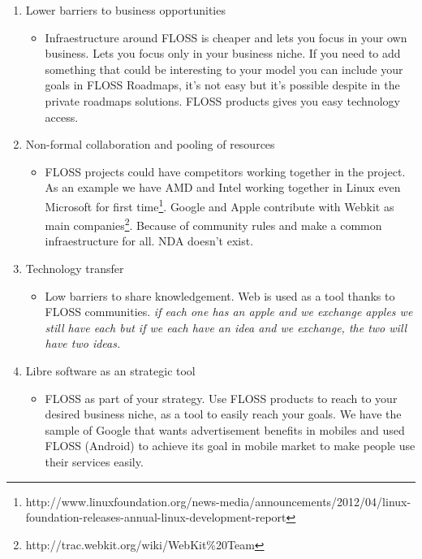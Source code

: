 \documentclass[11pt]{scrartcl}
\begin{document}
\begin{enumerate}
    \item Lower barriers to business opportunities
    \begin{itemize}
        \item Infraestructure around FLOSS is cheaper and lets you focus in your own business. Lets you focus only in your business niche. If you need to add something that could be interesting to your model you can include your goals in FLOSS Roadmaps, it's not easy but it's possible despite in the private roadmaps solutions. FLOSS products gives you easy technology access.
    \end{itemize}

    \item Non-formal collaboration and pooling of resources
    \begin{itemize}
        \item FLOSS projects could have competitors working together in the project. As an example we have AMD and Intel working together in Linux even Microsoft for first time\footnote{http://www.linuxfoundation.org/news-media/announcements/2012/04/linux-foundation-releases-annual-linux-development-report}. Google and Apple contribute with Webkit as main companies\footnote{http://trac.webkit.org/wiki/WebKit\%20Team}. Because of community rules and make a common infraestructure for all. NDA doesn't exist.
    \end{itemize}

    \item Technology transfer
    \begin{itemize}
        \item Low barriers to share knowledgement. Web is used as a tool thanks to FLOSS communities. \emph{if each one has an apple and we exchange apples we still have each but if we each have an idea and we exchange, the two will have two ideas.}
    \end{itemize}

    \item Libre software as an strategic tool
    \begin{itemize}
        \item FLOSS as part of your strategy. Use FLOSS products to reach to your desired business niche, as a tool to easily reach your goals. We have the sample of Google that wants advertisement benefits in mobiles and used FLOSS (Android) to achieve its goal in mobile market to make people use their services easily.
    \end{itemize}

\end{enumerate}
\end{document}
